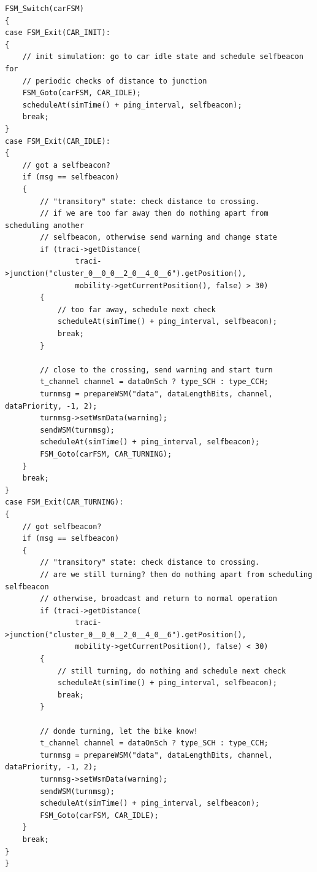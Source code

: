 \documentclass[11pt,letterpaper]{article}
\begin{document}
\begin{lstlisting}[style=CPP, label={lst:simple_car_fsm}, caption={Extracto del código encargado del comportamiento del automóvil.}]
FSM_Switch(carFSM)
{
case FSM_Exit(CAR_INIT):
{
	// init simulation: go to car idle state and schedule selfbeacon for
	// periodic checks of distance to junction
    FSM_Goto(carFSM, CAR_IDLE);
    scheduleAt(simTime() + ping_interval, selfbeacon);
    break;
}
case FSM_Exit(CAR_IDLE):
{
    // got a selfbeacon?
    if (msg == selfbeacon)
    {
		// "transitory" state: check distance to crossing.
		// if we are too far away then do nothing apart from scheduling another
		// selfbeacon, otherwise send warning and change state
        if (traci->getDistance(
                traci->junction("cluster_0__0_0__2_0__4_0__6").getPosition(),
                mobility->getCurrentPosition(), false) > 30)
        {
			// too far away, schedule next check
            scheduleAt(simTime() + ping_interval, selfbeacon);
            break;
        }

		// close to the crossing, send warning and start turn
        t_channel channel = dataOnSch ? type_SCH : type_CCH;
        turnmsg = prepareWSM("data", dataLengthBits, channel, dataPriority, -1, 2);
        turnmsg->setWsmData(warning);
        sendWSM(turnmsg);
        scheduleAt(simTime() + ping_interval, selfbeacon);
        FSM_Goto(carFSM, CAR_TURNING);
    }
    break;
}
case FSM_Exit(CAR_TURNING):
{
    // got selfbeacon?
    if (msg == selfbeacon)
	{
		// "transitory" state: check distance to crossing.
		// are we still turning? then do nothing apart from scheduling selfbeacon
		// otherwise, broadcast and return to normal operation
        if (traci->getDistance(
                traci->junction("cluster_0__0_0__2_0__4_0__6").getPosition(),
                mobility->getCurrentPosition(), false) < 30)
        {
			// still turning, do nothing and schedule next check
            scheduleAt(simTime() + ping_interval, selfbeacon);
            break;
        }

		// donde turning, let the bike know!
        t_channel channel = dataOnSch ? type_SCH : type_CCH;
        turnmsg = prepareWSM("data", dataLengthBits, channel, dataPriority, -1, 2);
        turnmsg->setWsmData(warning);
        sendWSM(turnmsg);
        scheduleAt(simTime() + ping_interval, selfbeacon);
        FSM_Goto(carFSM, CAR_IDLE);
    }
    break;
}
}
\end{lstlisting}



\end{document}
